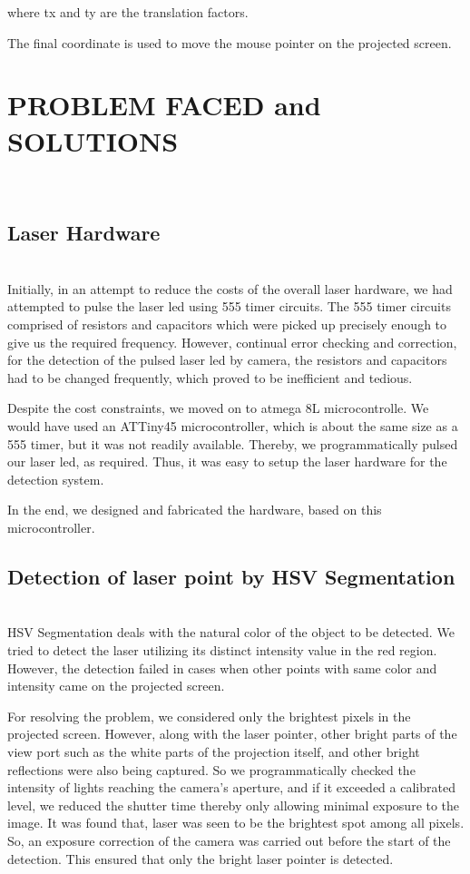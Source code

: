 \documentclass[12pt, a4paper]{article}
\begin{document}
where tx and ty are the translation factors.

The final coordinate is used to move the mouse pointer on the projected screen. 
\newpage
\section{PROBLEM FACED and SOLUTIONS}
~\\
\subsection{Laser Hardware}
~\\
Initially, in an attempt to reduce the costs of the overall laser hardware, we had attempted to pulse the laser led using 555 timer circuits. The 555 timer circuits comprised of resistors and capacitors which were picked up precisely enough to give us the required frequency. However, continual error checking and correction, for the detection of the pulsed laser led by camera, the resistors and capacitors had to be changed frequently, which proved to be inefficient and tedious.


Despite the cost constraints, we moved on to atmega 8L microcontrolle. We would have used an ATTiny45 microcontroller, which is about the same size as a 555 timer, but it was not readily available. Thereby, we programmatically pulsed our laser led, as required. Thus, it was easy to setup the laser hardware for the detection system.

In the end, we designed and fabricated the hardware, based on this microcontroller.


\subsection{Detection of laser point by HSV Segmentation}
~\\
HSV Segmentation deals with the natural color of the object to be detected. We tried to detect the laser utilizing its distinct intensity value in the red region. However, the detection failed in cases when other points with same color and intensity came on the projected screen.

For resolving the problem, we considered only the brightest pixels in the projected screen. However, along with the laser pointer, other bright parts of the view port such as the white parts of the projection itself, and other bright reflections were also being captured. So we programmatically checked the intensity of lights reaching the camera's aperture, and if it exceeded a calibrated level, we reduced the shutter time thereby only allowing minimal exposure to the image. It was found that, laser was seen to be the brightest spot among all pixels. So, an exposure correction of the camera was carried out before the start of the detection. This ensured that only the bright laser pointer is detected.
\newpage
\end{document}
